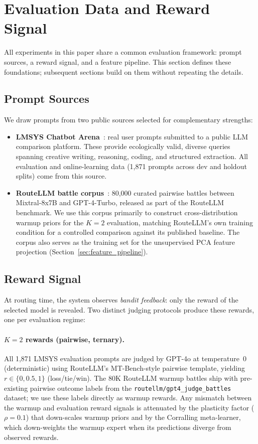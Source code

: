 \section{Evaluation Data and Reward Signal}
\label{sec:data}

All experiments in this paper share a common evaluation framework: prompt sources, a reward signal, and a feature pipeline.
This section defines these foundations; subsequent sections build on them without repeating the details.

\subsection{Prompt Sources}

We draw prompts from two public sources selected for complementary strengths:

\begin{itemize}[nosep,leftmargin=*]
    \item \textbf{LMSYS Chatbot Arena}~\cite{zheng2023judging}: real user prompts submitted to a public LLM comparison platform. These provide ecologically valid, diverse queries spanning creative writing, reasoning, coding, and structured extraction. All evaluation and online-learning data (1,871 prompts across dev and holdout splits) come from this source.
    \item \textbf{RouteLLM battle corpus}~\cite{ong2024routellm}: 80,000 curated pairwise battles between Mixtral-8x7B and GPT-4-Turbo, released as part of the RouteLLM benchmark. We use this corpus primarily to construct cross-distribution warmup priors for the $K{=}2$ evaluation, matching RouteLLM's own training condition for a controlled comparison against its published baseline. The corpus also serves as the training set for the unsupervised PCA feature projection (Section~\ref{sec:feature_pipeline}).
\end{itemize}

\subsection{Reward Signal}
\label{sec:reward_signal}

At routing time, the system observes \emph{bandit feedback}: only the reward of the selected model is revealed.
Two distinct judging protocols produce these rewards, one per evaluation regime:

\paragraph{$K{=}2$ rewards (pairwise, ternary).}
All 1,871 LMSYS evaluation prompts are judged by GPT-4o at temperature~0 (deterministic) using RouteLLM's MT-Bench-style pairwise template, yielding $r \in \{0, 0.5, 1\}$ (loss/tie/win).
The 80K RouteLLM warmup battles ship with pre-existing pairwise outcome labels from the \texttt{routellm/gpt4\_judge\_battles} dataset; we use these labels directly as warmup rewards.
Any mismatch between the warmup and evaluation reward signals is attenuated by the plasticity factor ($\rho{=}0.1$) that down-scales warmup priors and by the Corralling meta-learner, which down-weights the warmup expert when its predictions diverge from observed rewards.

